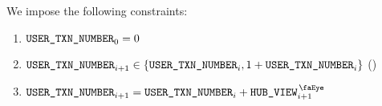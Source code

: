 We impose the following constraints:
\begin{enumerate}
	\item $\texttt{USER}\texttt{\_}\texttt{TXN\_NUMBER} _{0} = 0$
	\item $\texttt{USER}\texttt{\_}\texttt{TXN\_NUMBER} _{i + 1} \in \{ \texttt{USER}\texttt{\_}\texttt{TXN\_NUMBER} _{i}, 1 + \texttt{USER}\texttt{\_}\texttt{TXN\_NUMBER} _{i} \}$ (\sanityCheck)
	\item $\userTransactionNumber _{i + 1} =      \userTransactionNumber _{i} + \isUserTxnHubView     _{i + 1}$
\end{enumerate}
